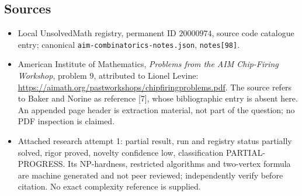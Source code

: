 \documentclass[11pt]{article}
\begin{document}
\subsection{Sources}
\begin{itemize}
\item Local UnsolvedMath registry, permanent ID $20000974$, source code catalogue entry; canonical \texttt{aim-combinatorics-notes.json}, \texttt{notes[98]}.
\item American Institute of Mathematics, \emph{Problems from the AIM Chip-Firing Workshop}, problem 9, attributed to Lionel Levine: \url{https://aimath.org/pastworkshops/chipfiringproblems.pdf}. The source refers to Baker and Norine as reference [7], whose bibliographic entry is absent here. An appended page header is extraction material, not part of the question; no PDF inspection is claimed.
\item Attached research attempt 1: partial result, run and registry status partially solved, rigor proved, novelty confidence low, classification PARTIAL-PROGRESS. Its NP-hardness, restricted algorithms and two-vertex formula are machine generated and not peer reviewed; independently verify before citation. No exact complexity reference is supplied.
\end{itemize}
\end{document}
